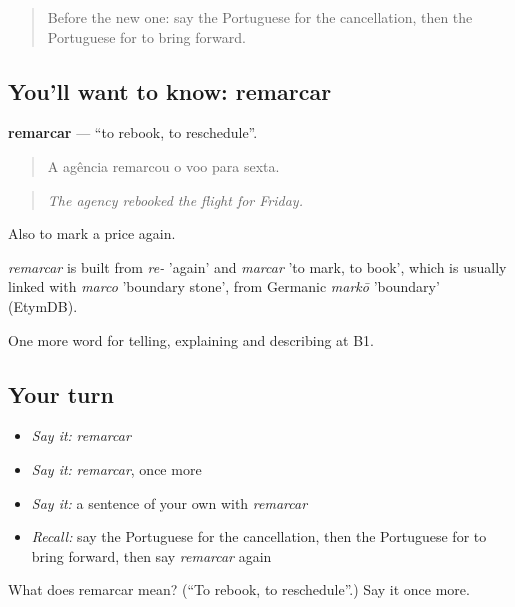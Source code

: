 \label{lesson:PT-C427-remarcar}



\begin{quote}
Before the new one: say the Portuguese for the cancellation, then the Portuguese for to bring forward.
\end{quote}

\subsection*{You'll want to know: remarcar}
\textbf{remarcar} — \textquotedblleft{}to rebook, to reschedule\textquotedblright{}.

\begin{quote}
A agência remarcou o voo para sexta.
\end{quote}

\begin{quote}
\emph{The agency rebooked the flight for Friday.}
\end{quote}

Also to mark a price again.

\begin{cousinweb}
\emph{remarcar} is built from \emph{re-} 'again' and \emph{marcar} 'to mark, to book', which is usually linked with \emph{marco} 'boundary stone', from Germanic \emph{markō} 'boundary' (EtymDB).
\end{cousinweb}

\begin{grammarlens}[title={What you've built}]
One more word for telling, explaining and describing at B1.
\end{grammarlens}

\subsection*{Your turn}
\begin{itemize}
\raggedright
  \item \emph{Say it:} \emph{remarcar}
  \item \emph{Say it:} \emph{remarcar}, once more
  \item \emph{Say it:} a sentence of your own with \emph{remarcar}
  \item \emph{Recall:} say the Portuguese for the cancellation, then the Portuguese for to bring forward, then say \emph{remarcar} again
\end{itemize}

\begin{tcolorbox}[breakable,colback=teal!4,colframe=teal!35!black,title={Before you move on}]
What does remarcar mean? (\textquotedblleft{}To rebook, to reschedule\textquotedblright{}.) Say it once more.
\end{tcolorbox}
